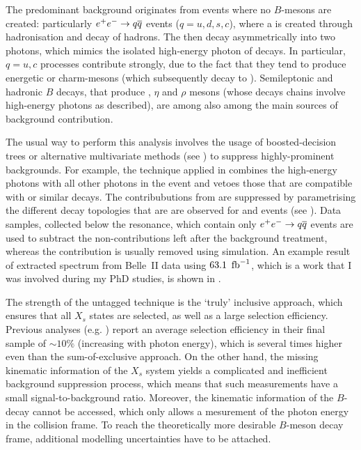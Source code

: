 The predominant background originates from events where no $B$-mesons are created: particularly $e^+e^-\rightarrow q\overline q$ events ($q={u,d,s,c}$), where a \piz is created through hadronisation and decay of hadrons.
The \piz then decay asymmetrically into two photons, which mimics the isolated high-energy photon of \BtoXsgamma decays.
In particular, $q={u,c}$ processes contribute strongly, due to the fact that they tend to produce energetic \piz or charm-mesons (which subsequently decay to \piz).
Semileptonic and hadronic $B$ decays, that produce \piz, $\eta$ and $\rho$ mesons (whose decays chains involve high-energy photons as described), are among also among the main sources of background contribution.

The usual way to perform this analysis involves the usage of boosted-decision trees or alternative multivariate methods (see ) to suppress highly-prominent backgrounds.
For example, the technique applied in \cite{CLEO:2001gsa,Belle:2009nth} combines the high-energy photons with all other photons in the event and vetoes those that are compatible with \piz or similar decays.
The contribubutions from \epem\ra\qqbar are suppressed by parametrising the different decay topologies that are are observed for \BB and \qqbar events (see ).
Data samples, collected below the \FourS resonance, which contain only $e^+e^-\rightarrow q\overline q$ events are used to subtract the non-\BB contributions left after the background treatment, 
whereas the \BB contribution is usually removed using simulation.
An example result of extracted \BtoXsgamma spectrum from Belle~II data using $63.1~\mbox{\,fb}^{-1}$, which is a work that I was involved during my PhD studies, is shown in  \cite{Collaboration:2302}.

The strength of the untagged technique is the `truly' inclusive approach, which ensures that all $X_s$ states are selected, as well as a large selection efficiency.
Previous analyses (e.g. \cite{Belle:2009nth}) report an average selection efficiency in their final sample of $\sim 10\%$ (increasing with photon energy), which is several times higher even than the sum-of-exclusive approach.
On the other hand, the missing kinematic information of the $X_s$ system yields a complicated and inefficient background suppression process, which means that such measurements have a small signal-to-background ratio.
Moreover, the kinematic information of the $B$-decay cannot be accessed, which only allows a mesurement of the photon energy in the \epem collision frame.
To reach the theoretically more desirable $B$-meson decay frame, additional modelling uncertainties have to be attached.

